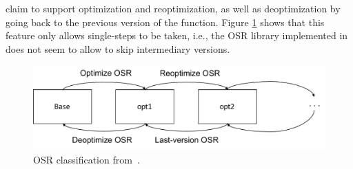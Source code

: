  claim to support optimization and reoptimization, as well as deoptimization by going back to the previous version of the function.
Figure \ref{OSR classification} shows that this feature only allows single-steps to be taken, i.e., the OSR library implemented in~\cite{lameed2013modular} does not seem to allow to skip intermediary versions.\\

\begin{figure}[h]
\centering
\includegraphics[scale=0.5]{Figures/OSRClassification.pdf}
\decoRule
\caption[OSR classification]{OSR classification from~\cite{lameed2013modular}.}
\label{OSR classification}
\end{figure}

